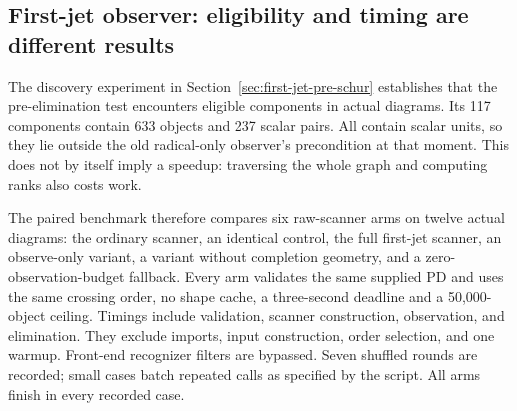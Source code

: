 \subsection{First-jet observer: eligibility and timing are different results}

The discovery experiment in Section~\ref{sec:first-jet-pre-schur} establishes
that the pre-elimination test encounters eligible components in actual
diagrams. Its 117 components contain 633 objects and 237 scalar pairs.
All contain scalar units, so they lie outside the old radical-only
observer's precondition at that moment. This does not by itself imply a
speedup: traversing the whole graph and computing ranks also costs work.

The paired benchmark therefore compares six raw-scanner arms on twelve
actual diagrams: the ordinary scanner, an identical control, the full
first-jet scanner, an observe-only variant, a variant without completion
geometry, and a zero-observation-budget fallback. Every arm validates the
same supplied PD and uses the same crossing order, no shape cache, a
three-second deadline and a 50,000-object ceiling. Timings include validation,
scanner construction, observation, and elimination. They exclude imports,
input construction, order selection, and one warmup. Front-end recognizer
filters are bypassed. Seven shuffled rounds are recorded; small cases
batch repeated calls as specified by the script. All arms finish in every
recorded case.

